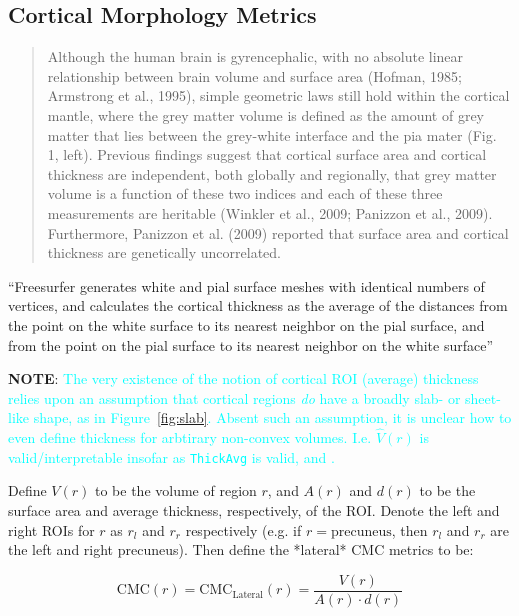 \documentclass{article}
\newcommand{\note}[2][cyan]{\textbf{NOTE}: \textcolor{#1}{#2}}
\begin{document}
\subsection{Cortical Morphology Metrics}

\citep{winklerCorticalThicknessGrey2010}

\begin{quotation}
Although the human brain is gyrencephalic, with no absolute
linear relationship between brain volume and surface area (Hofman,
1985; Armstrong et al., 1995), simple geometric laws still hold within
the cortical mantle, where the grey matter volume is defined as the
amount of grey matter that lies between the grey-white interface and
the pia mater (Fig. 1, left). Previous findings suggest that cortical
surface area and cortical thickness are independent, both globally and
regionally, that grey matter volume is a function of these two indices
and each of these three measurements are heritable (Winkler et al.,
2009; Panizzon et al., 2009). Furthermore, Panizzon et al. (2009)
reported that surface area and cortical thickness are genetically
uncorrelated.
\end{quotation}

``Freesurfer generates white and pial surface meshes with identical numbers
of vertices, and calculates the cortical thickness as the average of the
distances from the point on the white surface to its nearest neighbor on the
pial surface, and from the point on the pial surface to its nearest neighbor
on the white surface'' \citep{demirciCorticalThicknessSystematically2022}

\note{The very existence of the notion of cortical ROI (average) thickness relies
upon an assumption that cortical regions \emph{do} have a broadly slab- or sheet-like
shape, as in Figure~\ref{fig:slab}. Absent such an assumption, it is unclear how
to even define thickness for arbtirary non-convex volumes. I.e. \(\hat{V}(r)\) is
valid/interpretable insofar as \texttt{ThickAvg} is valid, and .}

Define \(V(r)\) to be the volume of region \(r\), and \(A(r)\) and \(d(r)\)
to be the surface area and average thickness, respectively, of the ROI\@.
Denote the left and right ROIs for \(r\) as \(r_l\) and \(r_r\) respectively
(e.g\@. if \(r=\text{precuneus}\), then \(r_l\) and \(r_r\) are the left and
right precuneus). Then define the *lateral* CMC metrics to be:

\begin{equation}
\text{CMC}(r) = \text{CMC}_{\text{Lateral}}(r) = \frac{V(r)}{A(r) \cdot d(r)}
\end{equation}
\end{document}
